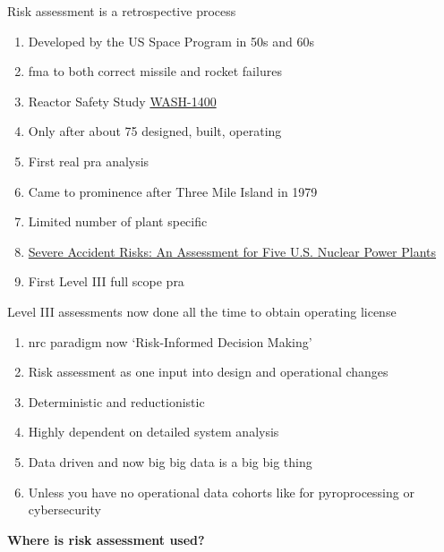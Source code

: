 \documentclass[aspectratio=1610,pdftex,dvipsnames,compress,xcolor={dvipsnames}]{beamer}
\newcommand{\acf}{\acrfull} %
\newcommand{\acs}{\acrshort} %
\newcommand{\acsp}{\acrshortpl} %
\begin{document}
\begin{frame}{Risk assessment is a retrospective process}
    \begin{enumerate}[series=outerlist,topsep=0pt,itemsep=11pt,leftmargin=*,label=(\arabic*)]
        \item[]Developed by the US Space Program in 50s and 60s
        \item[]\acf{fma} to both correct missile and rocket failures
        \item[]Reactor Safety Study \href{https://uidaho.pressbooks.pub/riskassessment/chapter/pra-2/}{WASH-1400}
        \item[]Only after about 75 \acsp{npp} designed, built, operating
        \item[]First real \acs{pra} analysis
        \item[]Came to prominence after Three Mile Island in 1979
        \item[]Limited number of plant specific \acsp{pra}
        \item[]\href{https://www.nrc.gov/reading-rm/doc-collections/nuregs/staff/sr1150/}{Severe Accident Risks: An Assessment for Five U.S. Nuclear Power Plants}
        \item[]First Level III full scope \acs{pra}
    \end{enumerate}
\end{frame}


\begin{frame}{Level III assessments now done all the time to obtain operating license}
    \begin{enumerate}[series=outerlist,topsep=0pt,itemsep=15pt,leftmargin=*,label=(\arabic*)]
        \item[]\acs{nrc} paradigm now `Risk-Informed Decision Making'
        \item[]Risk assessment as one input into design and operational changes
        \item[]Deterministic and reductionistic
        \item[]Highly dependent on detailed system analysis
        \item[]Data driven and now big big data is a big big thing 
        \item[]Unless you have no operational data cohorts like for pyroprocessing or cybersecurity
    \end{enumerate}
\end{frame}


\begin{frame}[plain]{}
    \centering\LARGE\textbf{Where is risk assessment used?}
\end{frame}
\end{document}
